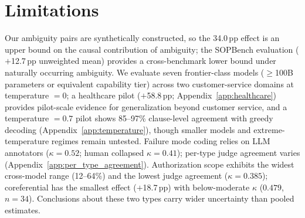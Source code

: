\section*{Limitations}
\label{sec:limitations}

Our ambiguity pairs are synthetically constructed, so the 34.0\,pp effect is an upper bound on the causal contribution of ambiguity; the SOPBench evaluation ($+$12.7\,pp unweighted mean) provides a cross-benchmark lower bound under naturally occurring ambiguity. We evaluate seven frontier-class models ($\geq$100B parameters or equivalent capability tier) across two customer-service domains at temperature $= 0$; a healthcare pilot ($+$58.8\,pp; Appendix~\ref{app:healthcare}) provides pilot-scale evidence for generalization beyond customer service, and a temperature $= 0.7$ pilot shows 85--97\% clause-level agreement with greedy decoding (Appendix~\ref{app:temperature}), though smaller models and extreme-temperature regimes remain untested. Failure mode coding relies on LLM annotators ($\kappa = 0.52$; human collapsed $\kappa = 0.41$); per-type judge agreement varies (Appendix~\ref{app:per_type_agreement}). Authorization scope exhibits the widest cross-model range (12--64\%) and the lowest judge agreement ($\kappa = 0.385$); coreferential has the smallest effect ($+$18.7\,pp) with below-moderate $\kappa$ ($0.479$, $n = 34$). Conclusions about these two types carry wider uncertainty than pooled estimates.
